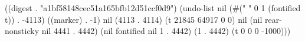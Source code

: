 
((digest . "a1bf58148cec51a165bfb12d51ccf0d9") (undo-list nil (#("
" 0 1 (fontified t)) . -4113) ((marker) . -1) nil (4113 . 4114) (t 21845 64917 0 0) nil (nil rear-nonsticky nil 4441 . 4442) (nil fontified nil 1 . 4442) (1 . 4442) (t 0 0 0 -1000)))
